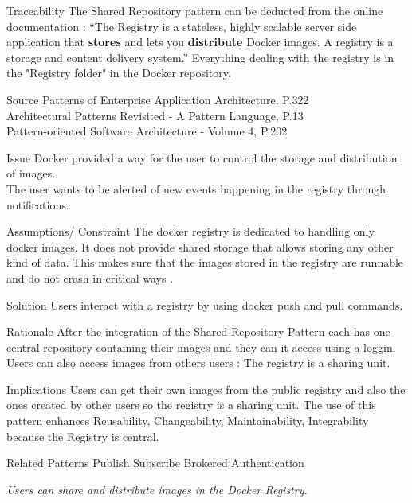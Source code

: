 \begin{patdescription}
\item[Traceability]
The Shared Repository pattern can be deducted from the online documentation : \cite{dockregistry} ``The Registry is a stateless, highly scalable server side application that \textbf{stores} and lets you \textbf{distribute} Docker images. A registry is a storage and content delivery system.''
Everything dealing with the registry is in the "Registry folder" in the Docker repository.


\item[Source]
Patterns of Enterprise Application Architecture, P.322 \cite{eaa}\\
Architectural Patterns Revisited - A Pattern Language, P.13 \cite{avgeriou2005architectural}\\
Pattern-oriented Software Architecture - Volume 4, P.202 \cite{wiley4}

\item[Issue]
Docker provided a way for the user to control the storage and distribution of images. \\
The user wants to be alerted of new events happening in the registry through notifications. %

\item[Assumptions/ Constraint]
The docker registry is dedicated to handling only docker images. It does not provide shared storage that allows storing any other kind of data. This makes sure that the images stored in the registry are runnable and do not crash in critical ways .


\item[Solution] %
Users interact with a registry by using docker push and pull commands. %

\item[Rationale] %
 After the integration of the Shared Repository Pattern each has one central repository containing their images and they can it access using a loggin.
 Users can also access images from others users : The registry is a sharing unit. \\
 
 \item [Implications]
Users can get their own images from the public registry and also the ones created by other users so the registry is a sharing unit. %
The use of this pattern enhances Reusability, Changeability, Maintainability, Integrability because the Registry is central.

\item [Related Patterns]
Publish Subscribe 
Brokered Authentication

\textit{Users can share and distribute images in the Docker Registry.}
 
\end{patdescription}

